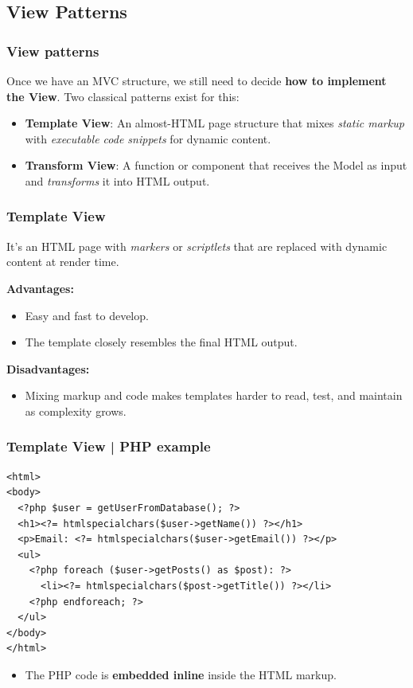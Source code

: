 \documentclass{beamer}
\begin{document}
\subsection{View Patterns}

\begin{frame}
  \frametitle{View patterns}

  Once we have an MVC structure, we still need to decide \textbf{how to implement the View}.
  Two classical patterns exist for this:

  \begin{itemize}
    \item \textbf{Template View}: An almost-HTML page structure that mixes \textit{static markup} with
      \textit{executable code snippets} for dynamic content.
    \item \textbf{Transform View}: A function or component that receives the Model as input
      and \textit{transforms} it into HTML output.
  \end{itemize}

\end{frame}

\begin{frame}
  \frametitle{Template View}

  It's an HTML page with \textit{markers} or \textit{scriptlets} that are replaced with dynamic content at render time.
  \newline
  
  \textbf{Advantages:}
  \begin{itemize}
    \item Easy and fast to develop.
    \item The template closely resembles the final HTML output.
  \end{itemize}
  \textbf{Disadvantages:}
  \begin{itemize}
    \item Mixing markup and code makes templates harder to read, test, and maintain as complexity grows.
  \end{itemize}

\end{frame}

\begin{frame}[fragile]
  \frametitle{Template View | PHP example}

  \begin{verbatim}
<html>
<body>
  <?php $user = getUserFromDatabase(); ?>
  <h1><?= htmlspecialchars($user->getName()) ?></h1>
  <p>Email: <?= htmlspecialchars($user->getEmail()) ?></p>
  <ul>
    <?php foreach ($user->getPosts() as $post): ?>
      <li><?= htmlspecialchars($post->getTitle()) ?></li>
    <?php endforeach; ?>
  </ul>
</body>
</html>
  \end{verbatim}

  \begin{itemize}
    \item The PHP code is \textbf{embedded inline} inside the HTML markup.
  \end{itemize}

\end{frame}
\end{document}
